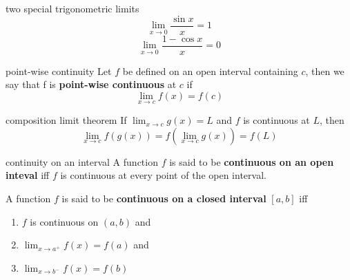 \documentclass[avery5371,grid]{flashcards}
\begin{document}
\begin{flashcard}[Theorem]{two special trigonometric limits}
\begin{equation*}
\lim_{x \rightarrow 0} \dfrac{\sin x}{x} = 1
\end{equation*}
\bigskip
\begin{equation*}
\lim_{x \rightarrow 0} \dfrac{1-\cos x}{x} = 0
\end{equation*}
\end{flashcard}

\begin{flashcard}[Definition]{point-wise continuity}
Let $f$ be defined on an open interval containing $c$, then 
we say that f is \textbf{point-wise continuous} at $c$ if 
\begin{equation*}
\lim_{x \rightarrow c} f(x) = f(c)
\end{equation*}
\end{flashcard}

\begin{flashcard}[Theorem]{composition limit theorem}
If $\lim_{x \rightarrow c} g(x) = L$ and $f$ is continuous at $L$, then
\begin{equation*}
\lim_{x \rightarrow c} f(g(x)) = f(\lim_{x \rightarrow c} g(x)) = f(L)
\end{equation*}
\end{flashcard}

\begin{flashcard}[Definition]{continuity on an interval}
A function $f$ is said to be \textbf{continuous on an open inteval}
iff $f$ is continuous at every point of the open interval.

A function $f$ is said to be \textbf{continuous on a closed interval}
$[a,b]$ iff
\begin{enumerate}
\item $f$ is continuous on $(a,b)$ and
\item $\lim_{x \rightarrow a^{+}} f(x) = f(a)$ and
\item $\lim_{x \rightarrow b^{-}} f(x) = f(b)$
\end{enumerate}
\end{flashcard}
\end{document}
